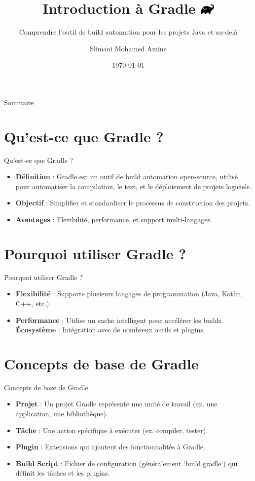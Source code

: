 \documentclass{clbeamer2024}
\title{
        Introduction à Gradle
	\includegraphics[width=0.7cm]{logos/gradle.png} \hfill
}
\subtitle{Comprendre l'outil de build automation pour les projets Java et au-delà}
\author{Slimani Mohamed Amine}
\institute{EHTP}
\date{\today}
\begin{document}
	\setcounter{framenumber}{-1}
	\frame{\titlepage}
	
	
	
	\begin{frame}{Sommaire}
		\tableofcontents
	\end{frame}
	
	
	\section{Qu'est-ce que Gradle ?}
	\begin{frame}{Qu'est-ce que Gradle ?}
		\begin{itemize}
			\item \textbf{Définition} : Gradle est un outil de build automation open-source, utilisé pour automatiser la compilation, le test, et le déploiement de projets logiciels.
			\item \textbf{Objectif} : Simplifier et standardiser le processus de construction des projets.
			\item \textbf{Avantages} : Flexibilité, performance, et support multi-langages.
		\end{itemize}
	\end{frame}
	
	\section{Pourquoi utiliser Gradle ?}
	\begin{frame}{Pourquoi utiliser Gradle ?}
		\begin{itemize}
			\item \textbf{Flexibilité} : Supporte plusieurs langages de programmation (Java, Kotlin, C++, etc.).
			\item \textbf{Performance} : Utilise un cache intelligent pour accélérer les builds.
			\textbf{Écosystème} : Intégration avec de nombreux outils et plugins.
		\end{itemize}
	\end{frame}
	
	
	\section{Concepts de base de Gradle}
	\begin{frame}{Concepts de base de Gradle}
		\begin{itemize}
			\item \textbf{Projet} : Un projet Gradle représente une unité de travail (ex. une application, une bibliothèque).
			\item \textbf{Tâche} : Une action spécifique à exécuter (ex. compiler, tester).
			\item \textbf{Plugin} : Extensions qui ajoutent des fonctionnalités à Gradle.
			\item \textbf{Build Script} : Fichier de configuration (généralement `build.gradle`) qui définit les tâches et les plugins.
		\end{itemize}
	\end{frame}
	
\end{document}
